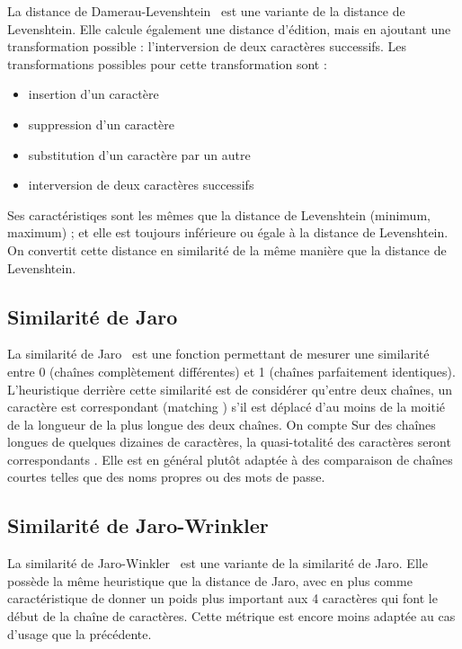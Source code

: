             La distance de Damerau-Levenshtein~\cite{damerau_levenshtein_wiki} est une variante de la distance de Levenshtein.
            Elle calcule également une distance d'édition, mais en ajoutant une transformation possible : l'interversion de deux caractères successifs.
            Les transformations possibles pour cette transformation sont :
            \begin{itemize}
                \item insertion d'un caractère 
                \item suppression d'un caractère
                \item substitution d'un caractère par un autre
                \item interversion de deux caractères successifs
            \end{itemize}
            Ses caractéristiqes sont les mêmes que la distance de Levenshtein (minimum, maximum) ; et elle est toujours inférieure ou égale à la distance de Levenshtein.
            On convertit cette distance en similarité de la même manière que la distance de Levenshtein.

            \subsection{Similarité de Jaro}
            
            La similarité de Jaro~\cite{jaro_wiki} est une fonction permettant de mesurer une similarité entre 0 (chaînes complètement différentes) et 1 (chaînes parfaitement identiques).
            L'heuristique derrière cette similarité est de considérer qu'entre deux chaînes, un caractère est \og correspondant \fg (\og matching \fg) s'il est déplacé d'au moins de la moitié de la longueur de la plus longue des deux chaînes.
            On compte         
            Sur des chaînes longues de quelques dizaines de caractères, la quasi-totalité des caractères seront \og correspondants \fg.
            Elle est en général plutôt adaptée à des comparaison de chaînes courtes telles que des noms propres ou des mots de passe.

            \subsection{Similarité de Jaro-Wrinkler}
            
            La similarité de Jaro-Winkler~\cite{jaro_winkler_wiki} est une variante de la similarité de Jaro.
            Elle possède la même heuristique que la distance de Jaro, avec en plus comme caractéristique de donner un poids plus important aux 4 caractères qui font le début de la chaîne de caractères.
            Cette métrique est encore moins adaptée au cas d'usage que la précédente.

